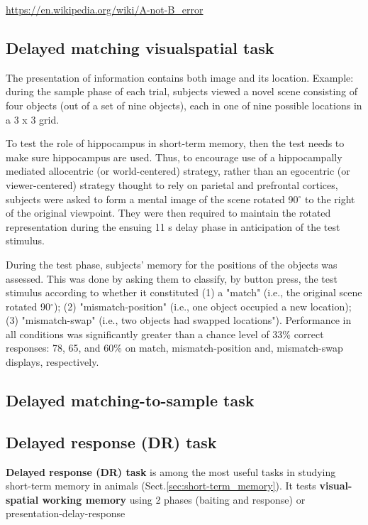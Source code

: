 \url{https://en.wikipedia.org/wiki/A-not-B_error}

\subsection{Delayed matching visualspatial task}
\label{sec:delayed-matching-to-visualspatial-task}

The presentation of information contains both image and its location. Example:
during the sample phase of each trial, subjects viewed a novel scene consisting
of four objects (out of a set of nine objects), each in one of nine possible
locations in a 3 x 3 grid.

To test the role of hippocampus in short-term memory, then the test  needs to
make sure hippocampus are used. Thus, to encourage use of a hippocampally
mediated allocentric (or world-centered) strategy, rather than an egocentric (or
viewer-centered) strategy thought to rely on parietal and prefrontal cortices,
subjects were asked to form a mental image of the scene rotated 90$^\circ$ to
the right of the original viewpoint. They were then required to maintain the rotated
representation during the ensuing 11 s delay phase in anticipation of the test
stimulus.

During the test phase, subjects' memory for the positions of the objects was
assessed. This was done by asking them to classify, by button press, the test
stimulus according to whether it constituted (1) a "match" (i.e., the original
scene rotated 90$^\circ$); (2) "mismatch-position" (i.e., one object occupied a new
location); (3) "mismatch-swap" (i.e., two objects had swapped locations").
Performance in all conditions was significantly greater than a chance level of
33\% correct responses: 78, 65, and 60\% on match, mismatch-position and,
mismatch-swap displays, respectively.



\subsection{Delayed matching-to-sample task}
\label{sec:delayed-matching-to-sample-task}



\subsection{Delayed response (DR) task}
\label{sec:delayed-response-task}

{\bf Delayed response (DR) task} is among the most useful tasks in studying
short-term memory in animals (Sect.\ref{sec:short-term_memory}).
It tests {\bf visual-spatial working memory} using 2 phases (baiting and
response) or presentation-delay-response

